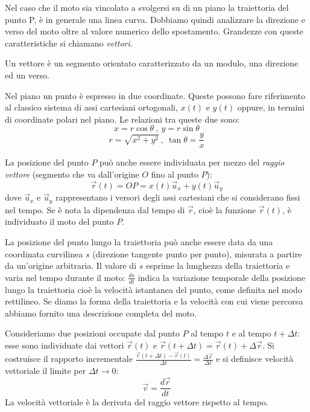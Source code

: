 \documentclass[class=book, crop=false, oneside, 12pt]{standalone}
\begin{document}
Nel caso che il moto sia vincolato a svolgersi su di un piano la traiettoria del punto P,
è in generale  una linea curva. Dobbiamo quindi analizzare la direzione e verso del moto oltre al valore numerico dello spostamento.
Grandezze con queste caratteristiche si chiamano \emph{vettori}.

Un vettore è un segmento orientato caratterizzato da un modulo, una direzione ed un verso.

Nel piano un punto è espresso in due coordinate. Queste possono fare riferimento al classico sistema di assi cartesiani ortogonali, 
\(x(t)\) e \(y(t)\) oppure, in termini di coordinate polari nel piano. 
Le relazioni tra queste due sono:
\begin{equation}
  x = r \cos \theta \ , \ y = r \sin \theta
\end{equation}
\begin{equation}
  r = \sqrt{x^2 + y^2 } \ , \ \tan \theta = \frac{y}{x}
\end{equation}

La posizione del punto \(P\) può anche essere individuata per mezzo del \emph{raggio vettore} (segmento che va dall'origine \(O\) fino al punto \(P\)):
\begin{equation}
  \overrightarrow{r}(t) = OP = x(t) \overrightarrow{u}_x + y(t) \overrightarrow{u}_y
\end{equation}
dove \(\overrightarrow{u}_x\) e \(\overrightarrow{u}_y\) rappresentano i versori degli assi cartesiani che si considerano fissi nel tempo.
Se è nota la dipendenza dal tempo di \(\overrightarrow{r}\), cioè la funzione \(\overrightarrow{r}(t)\), è individuato il moto del punto \(P\).

La posizione del punto lungo la traiettoria può anche essere data da una coordinata curvilinea \(s\) (direzione tangente punto per punto), misurata a partire da un'origine arbitraria. Il valore di \(s\) esprime la lunghezza della traiettoria e varia nel tempo durante il moto: \(\frac{ds}{dt}\) indica la variazione temporale della posizione lungo la traiettoria cioè la velocità istantanea del punto, come definita nel modo rettilineo. 
Se diamo la forma della traiettoria e la velocità con cui viene percorsa abbiamo fornito una descrizione completa del moto. 

Consideriamo due posizioni occupate dal punto \(P\) al tempo \(t\) e al tempo \(t + \Delta t\): esse sono individuate dai vettori \(\overrightarrow{r}(t)\) e \(\overrightarrow{r}(t + \Delta t) = \overrightarrow{r}(t) + \Delta \overrightarrow{r}\).
Si costruisce il rapporto incrementale \(\frac{\overrightarrow{r}(t+\Delta t) - \overrightarrow{r}(t)}{\Delta t} = \frac{\Delta \overrightarrow{r}}{\Delta t}\) e si definisce velocità vettoriale il limite per \(\Delta t \rightarrow 0\):
\begin{equation}
  \overrightarrow{v} = \frac{d \overrightarrow{r}}{dt}
\end{equation}
La velocità vettoriale è la derivata del raggio vettore rispetto al tempo. 
\end{document}
